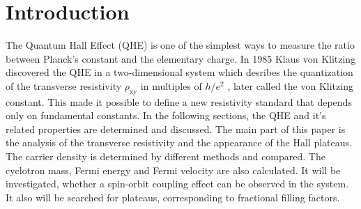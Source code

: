 \section{Introduction}
The Quantum Hall Effect (QHE) is one of the simplest ways to measure the ratio between Planck's constant 
and the elementary charge. In 1985 Klaus von Klitzing discovered the QHE in a two-dimensional system which
desribes the quantization of the transverse resistivity $\rho_\text{xy}$ in multiples of $h/e^2$ \cite{Nobelpreis}, later called the von 
Klitzing constant.
This made it possible to define a new resistivity standard that depends only on fundamental constants. 
In the following sections, the QHE and it's related properties are determined and discussed. 
The main part of this paper is the analysis of the transverse resistivity and the appearance of the Hall plateaus.
The carrier density is determined by different methods and compared. 
The cyclotron mass, Fermi energy and Fermi velocity are also calculated.
It will be investigated, whether a spin-orbit coupling effect can be observed in the system.
It also will be searched for plateaus, corresponding to fractional filling factors.\\

